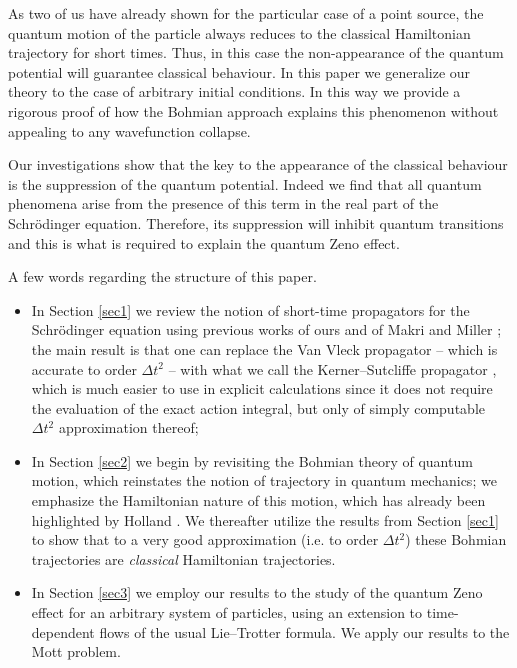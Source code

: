\documentclass[12pt]{article}%
\begin{document}
As two of us \cite{gohi2} have already shown for the particular case of a
point source, the quantum motion of the particle always reduces to the
classical Hamiltonian trajectory for short times. Thus, in this case the
non-appearance of the quantum potential will guarantee classical behaviour. In
this paper we generalize our theory to the case of arbitrary initial
conditions. In this way we provide a rigorous proof of how the Bohmian
approach explains this phenomenon without appealing to any wavefunction collapse.

Our investigations show that the key to the appearance of the classical
behaviour is the suppression of the quantum potential. Indeed we find that all
quantum phenomena arise from the presence of this term in the real part of the
Schr\"{o}dinger equation. Therefore, its suppression will inhibit quantum
transitions and this is what is required to explain the quantum Zeno effect.

A few words regarding the structure of this paper.

\begin{itemize}
\item In Section \ref{sec1} we review the notion of short-time propagators for
the Schr\"{o}dinger equation using previous works of ours
\cite{ICP,gohi2,gohi3} and of Makri and Miller \cite{makmil1,makmil2}; the
main result is that one can replace the Van Vleck propagator -- which is
accurate to order $\Delta t^{2}$ -- with what we call the Kerner--Sutcliffe
propagator \cite{Kerner}, which is much easier to use in explicit calculations
since it does not require the evaluation of the exact action integral, but
only of simply computable $\Delta t^{2}$ approximation thereof;

\item In Section \ref{sec2} we begin by revisiting the Bohmian theory of
quantum motion, which reinstates the notion of trajectory in quantum
mechanics; we emphasize the Hamiltonian nature of this motion, which has
already been highlighted by Holland \cite{Holland1,Holland2}. We thereafter
utilize the results from Section \ref{sec1} to show that to a very good
approximation (i.e. to order $\Delta t^{2}$) these Bohmian trajectories are
\emph{classical} Hamiltonian trajectories.

\item In Section \ref{sec3} we employ our results to the study of the quantum
Zeno effect for an arbitrary system of particles, using an extension to
time-dependent flows of the usual Lie--Trotter formula. We apply our results
to the Mott problem.
\end{itemize}
\end{document}
